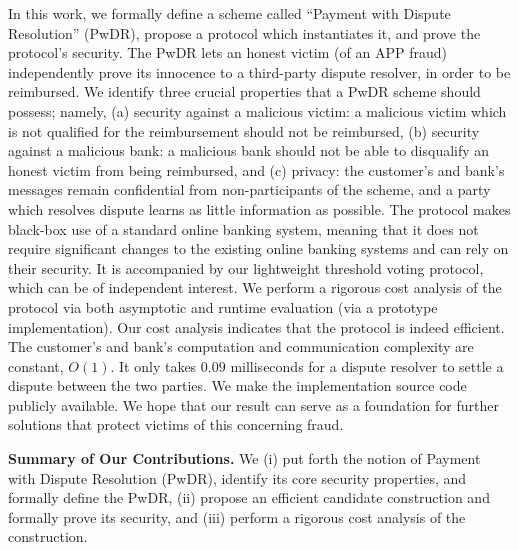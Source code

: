 In this work, we formally define a scheme called ``Payment with Dispute Resolution'' (PwDR),  propose a protocol which instantiates it, and  prove the protocol's security.  The PwDR lets an honest victim (of an APP fraud)  independently prove its innocence to a third-party dispute resolver, in order to be reimbursed.  We identify three crucial properties that a PwDR scheme should possess; namely, (a) security against a malicious victim: a malicious victim  which is not qualified for the reimbursement should not be reimbursed, (b) security against a malicious bank: a malicious bank should not be able to disqualify an honest victim  from being reimbursed, and (c) privacy: the customer’s and bank’s messages remain confidential from non-participants of the scheme, and a party which resolves dispute  learns as little information as possible.  The  protocol makes black-box use of a standard  online banking system, meaning that it does not require significant changes to the existing online banking systems and can rely on their security. It is accompanied by our lightweight threshold voting protocol, which can be of independent interest. We perform a rigorous cost analysis of the protocol via both asymptotic and runtime  evaluation (via a prototype implementation). Our cost analysis indicates that the protocol is indeed efficient. The customer's and bank's computation and communication complexity are constant, $O(1)$. It only takes $0.09$ milliseconds for a dispute resolver to settle a dispute between the two parties. We  make  the implementation source code publicly available. We hope that our result can serve as a foundation for further solutions that protect victims of this concerning  fraud. 



 


  





\vspace{2mm}

\noindent\textbf{Summary of Our Contributions.} We (i) put forth the notion of Payment with Dispute Resolution (PwDR), identify its core security properties, and  formally define the PwDR, (ii) propose an efficient candidate construction  and formally prove its security, and (iii) perform a rigorous cost analysis of the construction.     





